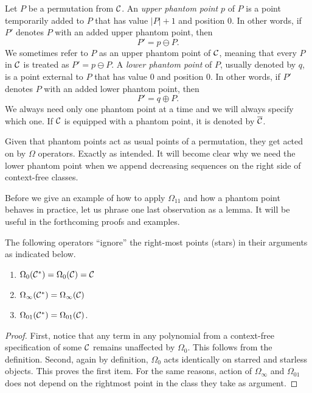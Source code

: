 \documentclass[12pt, a4paper, twoside]{report}
\begin{document}
\begin{definition}
  Let $P$ be a permutation from $\mathcal{C}$. An \emph{upper phantom point} $p$ of $P$ is a point temporarily added to $P$ that has value $|P|+1$ and position $0$. In other words, if $P'$ denotes $P$ with an added upper phantom point, then
  $$P' = p \ominus P.$$
  We sometimes refer to $P$ as an upper phantom point of $\mathcal{C}$, meaning that every $P$ in $\mathcal{C}$ is treated as $P' = p \ominus P$. A \emph{lower phantom point} of $P$, usually denoted by $q$, is a point external to $P$ that has value $0$ and position $0$. In other words, if $P'$ denotes $P$ with an added lower phantom point, then
  $$P' = q \oplus P.$$
We always need only one phantom point at a time and we will always specify which one. If $\mathcal{C}$ is equipped with a phantom point, it is denoted by $\overline{\mathcal{C}}$.
\end{definition}
Given that phantom points act as usual points of a permutation, they get acted on by $\Omega$ operators. Exactly as intended. It will become clear why we need the lower phantom point when we append decreasing sequences on the right side of context-free classes.

Before we give an example of how to apply $\Omega_{11}$ and how a phantom point behaves in practice, let us phrase one last observation as a lemma. It will be useful in the forthcoming proofs and examples.

\begin{lemma}
  The following operators ``ignore'' the right-most points (stars) in their arguments as indicated below.
  \begin{enumerate}
  \item $\Omega_0(\mathcal{C}^*) = \Omega_0(\mathcal{C}) = \mathcal{C}$
  \item $\Omega_\infty(\mathcal{C}^*) = \Omega_\infty(\mathcal{C})$
  \item $\Omega_{01}(\mathcal{C}^*) = \Omega_{01}(\mathcal{C})$.
  \end{enumerate}
  \label{lem:ignorance}
\end{lemma}
\begin{proof}
First, notice that any term in any polynomial from a context-free specification of some $\mathcal{C}$ remains unaffected by $\Omega_0$. This follows from the definition. Second, again by definition, $\Omega_0$ acts identically on starred and starless objects. This proves the first item. For the same reasons, action of $\Omega_\infty$ and $\Omega_{01}$ does not depend on the rightmost point in the class they take as argument.
\end{proof}
\end{document}
